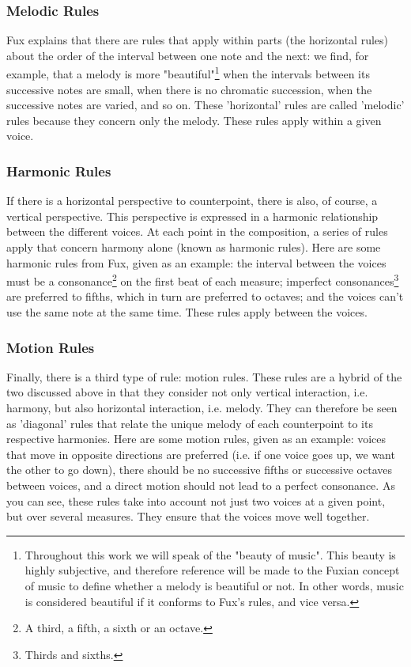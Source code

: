 \subsubsection{Melodic Rules}

Fux explains that there are rules that apply within parts (the horizontal rules) about the order of the interval between one note and the next: we find, for example, that a melody is more "beautiful"\footnote{Throughout this work we will speak of the "beauty of music". This beauty is highly subjective, and therefore reference will be made to the Fuxian concept of music to define whether a melody is beautiful or not. In other words, music is considered beautiful if it conforms to Fux's rules, and vice versa.} when the intervals between its successive notes are small, when there is no chromatic succession, when the successive notes are varied, and so on. These 'horizontal' rules are called 'melodic' rules because they concern only the melody. These rules apply within a given voice.


\subsubsection{Harmonic Rules}


If there is a horizontal perspective to counterpoint, there is also, of course, a vertical perspective. This perspective is expressed in a harmonic relationship between the different voices. At each point in the composition, a series of rules apply that concern harmony alone (known as harmonic rules). Here are some harmonic rules from Fux, given as an example: the interval between the voices must be a consonance\footnote{A third, a fifth, a sixth or an octave.} on the first beat of each measure; imperfect consonances\footnote{Thirds and sixths.} are preferred to fifths, which in turn are preferred to octaves; and the voices can't use the same note at the same time. These rules apply between the voices.

\subsubsection{Motion Rules}
Finally, there is a third type of rule: motion rules. These rules are a hybrid of the two discussed above in that they consider not only vertical interaction, i.e. harmony, but also horizontal interaction, i.e. melody. They can therefore be seen as 'diagonal' rules that relate the unique melody of each counterpoint to its respective harmonies. Here are some motion rules, given as an example: voices that move in opposite directions are preferred (i.e. if one voice goes up, we want the other to go down), there should be no successive fifths or successive octaves between voices, and a direct motion should not lead to a perfect consonance. As you can see, these rules take into account not just two voices at a given point, but over several measures. They ensure that the voices move well together.

